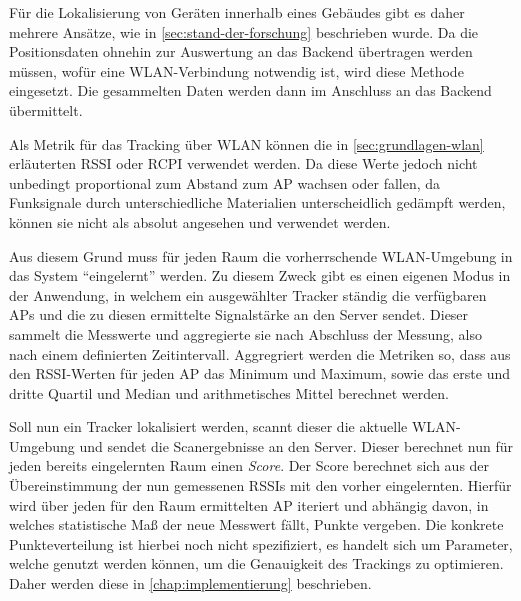 Für die Lokalisierung von Geräten innerhalb eines Gebäudes gibt es daher mehrere Ansätze, wie in
\autoref{sec:stand-der-forschung} beschrieben wurde.
Da die Positionsdaten ohnehin zur Auswertung an das Backend übertragen werden müssen, wofür eine
\gls{WLAN}-Verbindung notwendig ist, wird diese Methode eingesetzt.
Die gesammelten Daten werden dann im Anschluss an das Backend übermittelt.

Als Metrik für das Tracking über \gls{WLAN} können die in \autoref{sec:grundlagen-wlan} erläuterten
\gls{RSSI} oder \gls{RCPI} verwendet werden. Da diese Werte jedoch nicht unbedingt proportional zum
Abstand zum \gls{AP} wachsen oder fallen, da Funksignale durch unterschiedliche Materialien
unterscheidlich gedämpft werden, können sie nicht als absolut angesehen und verwendet werden.

Aus diesem Grund muss für jeden Raum die vorherrschende \gls{WLAN}-Umgebung in das System
\enquote{eingelernt} werden. Zu diesem Zweck gibt es einen eigenen Modus in der Anwendung, in
welchem ein ausgewählter Tracker ständig die verfügbaren \glspl{AP} und die zu diesen ermittelte
Signalstärke an den Server sendet. Dieser sammelt die Messwerte und aggregierte sie nach Abschluss
der Messung, also nach einem definierten Zeitintervall. Aggregriert werden die Metriken so, dass aus
den \gls{RSSI}-Werten für jeden \gls{AP} das Minimum und Maximum, sowie das erste und dritte Quartil
und Median und arithmetisches Mittel berechnet werden.

Soll nun ein Tracker lokalisiert werden, scannt dieser die aktuelle \gls{WLAN}-Umgebung und sendet
die Scanergebnisse an den Server. Dieser berechnet nun für jeden bereits eingelernten Raum einen
\textit{Score}. Der Score berechnet sich aus der Übereinstimmung der nun gemessenen \glspl{RSSI} mit
den vorher eingelernten. Hierfür wird über jeden für den Raum ermittelten \gls{AP} iteriert und
abhängig davon, in welches statistische Maß der neue Messwert fällt, Punkte vergeben. Die konkrete
Punkteverteilung ist hierbei noch nicht spezifiziert, es handelt sich um Parameter, welche genutzt
werden können, um die Genauigkeit des Trackings zu optimieren. Daher werden diese in
\autoref{chap:implementierung} beschrieben.

